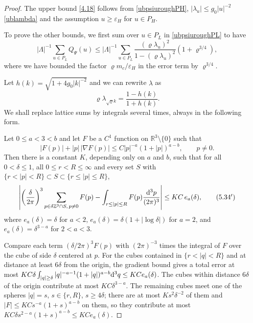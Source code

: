 \documentclass[11pt]{article}
\numberwithin{equation}{section}
\newcommand{\e}{\varepsilon}
\newcommand{\rd}{{\rm d}}
\newcommand{\beq}{\begin{equation}}
\newcommand{\eeq}{\end{equation}}
\newcommand\Z{{\mathbb Z}}
\newcommand\R{{\mathbb R}}
\newcommand\eps{\varepsilon}
\renewcommand\rho\varrho
\theoremstyle{definition}
\begin{document}
\begin{proof} The upper bound \eqref{4.18} follows from \eqref{ubpsiuroughPH}, 
$|\lambda_u|\leq g_0|u|^{-2}$ \eqref{ublambda} and the assumption  $u \ge \e_H$ for $u \in P_H$.  

To prove the other bounds, we  first  sum over $u \in P_L$ in \eqref{ubpsiuroughPL} to have 
\beq
|\Lambda|^{-1}\sum_{u\in P_L} Q_\Psi(u)\leq    |\Lambda|^{-1} 
\sum_{u\in P_L}\frac{(\rho\lambda_u)^2}{1-(\rho\lambda_u)^2}(1+\rho^{3/4}), 
\eeq
where we have bounded the factor $\rho m_c /\e_H$ in the error term by $\rho^{3/4}$. 



Let $h(k)=\sqrt{1+4g_0|k|^{-2}}$ and we can rewrite $\lambda$ as 
\beq \label{defhk}
\rho\lambda_{\sqrt {\rho} k} = 
 \frac {1 - h(k)} { 1 + h(k) }   .
 \eeq
We shall replace lattice sums by integrals several times, always in the following form.

\smallskip{} Let $0\leq a<3<b$ and let $F$ be a $C^1$ function on $\R^3\setminus\{0\}$ such that
\[
|F(p)|+|p|\,|\nabla F(p)|\leq C|p|^{-a}(1+|p|)^{a-b},\qquad p\neq 0 .
\]
Then there is a constant $K$, depending only on $a$ and $b$, such that for all $0<\delta\leq1$, all $0\leq r<R\leq\infty$ and every set $S$ with $\{r<|p|<R\}\subset S\subset\{r\leq|p|\leq R\}$,
\begin{equation*}
\left|\left(\frac{\delta}{2\pi}\right)^3\sum_{p\in\delta\Z^3\cap S,\, p\neq0}F(p)-\int_{r\leq|p|\leq R}F(p)\frac{\rd^3p}{(2\pi)^3}\right|\leq KC\,e_a(\delta),
\tag{5.34$'$}\label{riemann}
\end{equation*}
where $e_a(\delta)=\delta$ for $a<2$, $e_a(\delta)=\delta(1+|\log\delta|)$ for $a=2$, and $e_a(\delta)=\delta^{3-a}$ for $2<a<3$.

\smallskip{} Compare each term $(\delta/2\pi)^3F(p)$ with $(2\pi)^{-3}$ times the integral of $F$ over the cube of side $\delta$ centered at $p$. For the cubes contained in $\{r<|q|<R\}$ and at distance at least $6\delta$ from the origin, the gradient bound gives a total error at most $KC\delta\int_{|q|\geq\delta}|q|^{-a-1}(1+|q|)^{a-b}\rd^3q\leq KC e_a(\delta)$. The cubes within distance $6\delta$ of the origin contribute at most $KC\delta^{3-a}$. The remaining cubes meet one of the spheres $|q|=s$, $s\in\{r,R\}$, $s\geq4\delta$; there are at most $Ks^2\delta^{-2}$ of them and $|F|\leq KCs^{-a}(1+s)^{a-b}$ on them, so they contribute at most $KC\delta s^{2-a}(1+s)^{a-b}\leq KCe_a(\delta)$.


\end{proof}
\end{document}
